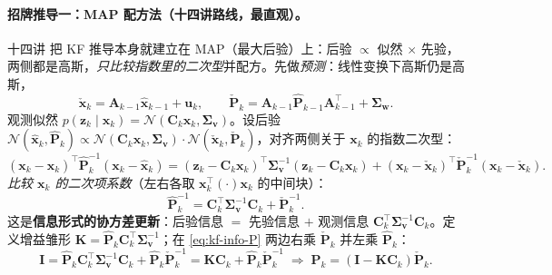 \paragraph{招牌推导一：MAP 配方法（十四讲路线，最直观）。}\label{par:kf-map-route}
十四讲\cite{gaoxiang2019slam14} 把 KF 推导本身就建立在 MAP（最大后验）上：后验 $\propto$ 似然 $\times$ 先验，两侧都是高斯，\emph{只比较指数里的二次型}并配方。先做\emph{预测}：线性变换下高斯仍是高斯，
\begin{equation}
  \check{\mathbf{x}}_k=\mathbf{A}_{k-1}\hat{\mathbf{x}}_{k-1}+\mathbf{u}_k,\qquad
  \check{\mathbf{P}}_k=\mathbf{A}_{k-1}\hat{\mathbf{P}}_{k-1}\mathbf{A}_{k-1}^\top+\boldsymbol{\Sigma}_{\mathbf{w}}.
  \label{eq:kf-map-predict}
\end{equation}
观测似然 $p(\mathbf{z}_k\mid\mathbf{x}_k)=\mathcal{N}(\mathbf{C}_k\mathbf{x}_k,\boldsymbol{\Sigma}_{\mathbf{v}})$。设后验 $\mathcal{N}(\hat{\mathbf{x}}_k,\hat{\mathbf{P}}_k)\propto\mathcal{N}(\mathbf{C}_k\mathbf{x}_k,\boldsymbol{\Sigma}_{\mathbf{v}})\cdot\mathcal{N}(\check{\mathbf{x}}_k,\check{\mathbf{P}}_k)$，对齐两侧关于 $\mathbf{x}_k$ 的指数二次型：
\begin{equation}
  (\mathbf{x}_k-\hat{\mathbf{x}}_k)^\top\hat{\mathbf{P}}_k^{-1}(\mathbf{x}_k-\hat{\mathbf{x}}_k)
  =(\mathbf{z}_k-\mathbf{C}_k\mathbf{x}_k)^\top\boldsymbol{\Sigma}_{\mathbf{v}}^{-1}(\mathbf{z}_k-\mathbf{C}_k\mathbf{x}_k)
  +(\mathbf{x}_k-\check{\mathbf{x}}_k)^\top\check{\mathbf{P}}_k^{-1}(\mathbf{x}_k-\check{\mathbf{x}}_k).
  \label{eq:kf-quadform}
\end{equation}
\emph{比较 $\mathbf{x}_k$ 的二次项系数}（左右各取 $\mathbf{x}_k^\top(\cdot)\mathbf{x}_k$ 的中间块）：
\begin{equation}
  \hat{\mathbf{P}}_k^{-1}=\mathbf{C}_k^\top\boldsymbol{\Sigma}_{\mathbf{v}}^{-1}\mathbf{C}_k+\check{\mathbf{P}}_k^{-1}.
  \label{eq:kf-info-P}
\end{equation}
这是\textbf{信息形式的协方差更新}：后验信息 $=$ 先验信息 $+$ 观测信息 $\mathbf{C}_k^\top\boldsymbol{\Sigma}_{\mathbf{v}}^{-1}\mathbf{C}_k$。定义增益雏形 $\mathbf{K}=\hat{\mathbf{P}}_k\mathbf{C}_k^\top\boldsymbol{\Sigma}_{\mathbf{v}}^{-1}$；在 \cref{eq:kf-info-P} 两边右乘 $\check{\mathbf{P}}_k$ 并左乘 $\hat{\mathbf{P}}_k$：
\begin{equation}
  \mathbf{I}=\hat{\mathbf{P}}_k\mathbf{C}_k^\top\boldsymbol{\Sigma}_{\mathbf{v}}^{-1}\mathbf{C}_k+\hat{\mathbf{P}}_k\check{\mathbf{P}}_k^{-1}
  =\mathbf{K}\mathbf{C}_k+\hat{\mathbf{P}}_k\check{\mathbf{P}}_k^{-1}
  \;\Longrightarrow\;\hat{\mathbf{P}}_k=(\mathbf{I}-\mathbf{K}\mathbf{C}_k)\check{\mathbf{P}}_k.
  \label{eq:kf-Phat}
\end{equation}
